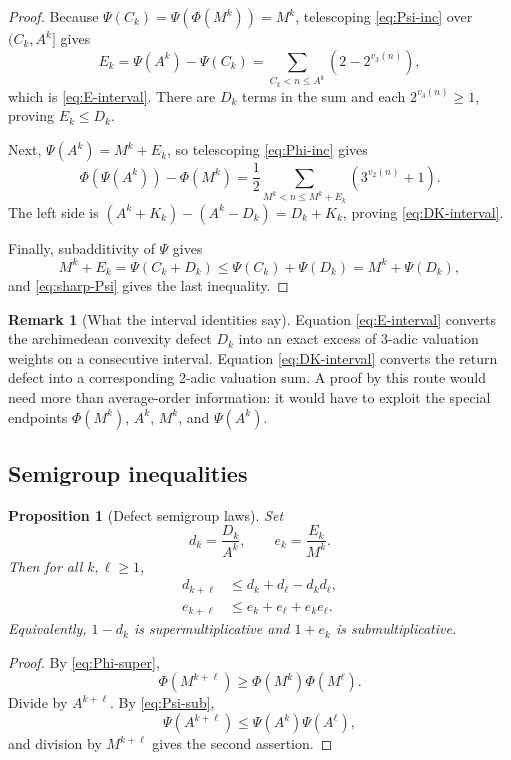 \documentclass[11pt]{article}
\newtheorem{proposition}[theorem]{Proposition}
\theoremstyle{definition}
\newtheorem{remark}[theorem]{Remark}
\begin{document}
\begin{proof}
Because \(\Psi(C_k)=\Psi(\Phi(M^k))=M^k\), telescoping
\cref{eq:Psi-inc} over \((C_k,A^k]\) gives
\[
 E_k=\Psi(A^k)-\Psi(C_k)
 =\sum_{C_k<n\le A^k}(2-2^{v_3(n)}),
\]
which is \cref{eq:E-interval}.  There are \(D_k\) terms in the sum and each
\(2^{v_3(n)}\ge1\), proving \(E_k\le D_k\).

Next, \(\Psi(A^k)=M^k+E_k\), so telescoping \cref{eq:Phi-inc} gives
\[
 \Phi(\Psi(A^k))-\Phi(M^k)
 =\frac12\sum_{M^k<n\le M^k+E_k}(3^{v_2(n)}+1).
\]
The left side is \((A^k+K_k)-(A^k-D_k)=D_k+K_k\), proving
\cref{eq:DK-interval}.

Finally, subadditivity of \(\Psi\) gives
\[
 M^k+E_k=\Psi(C_k+D_k)
 \le\Psi(C_k)+\Psi(D_k)=M^k+\Psi(D_k),
\]
and \cref{eq:sharp-Psi} gives the last inequality.
\end{proof}

\begin{remark}[What the interval identities say]
Equation \cref{eq:E-interval} converts the archimedean convexity defect
\(D_k\) into an exact excess of 3-adic valuation weights on a consecutive
interval.  Equation \cref{eq:DK-interval} converts the return defect into a
corresponding 2-adic valuation sum.  A proof by this route would need more
than average-order information: it would have to exploit the special
endpoints \(\Phi(M^k)\), \(A^k\), \(M^k\), and \(\Psi(A^k)\).
\end{remark}

\subsection{Semigroup inequalities}

\begin{proposition}[Defect semigroup laws]\label{prop:defect-semigroup}
Set
\[
 d_k=\frac{D_k}{A^k},\qquad e_k=\frac{E_k}{M^k}.
\]
Then for all \(k,\ell\ge1\),
\begin{align}
 d_{k+\ell}&\le d_k+d_\ell-d_kd_\ell,
 \label{eq:d-semigroup}\\
 e_{k+\ell}&\le e_k+e_\ell+e_ke_\ell.
 \label{eq:e-semigroup}
\end{align}
Equivalently, \(1-d_k\) is supermultiplicative and \(1+e_k\) is
submultiplicative.
\end{proposition}

\begin{proof}
By \cref{eq:Phi-super},
\[
 \Phi(M^{k+\ell})\ge\Phi(M^k)\Phi(M^\ell).
\]
Divide by \(A^{k+\ell}\).  By \cref{eq:Psi-sub},
\[
 \Psi(A^{k+\ell})\le\Psi(A^k)\Psi(A^\ell),
\]
and division by \(M^{k+\ell}\) gives the second assertion.
\end{proof}
\end{document}
